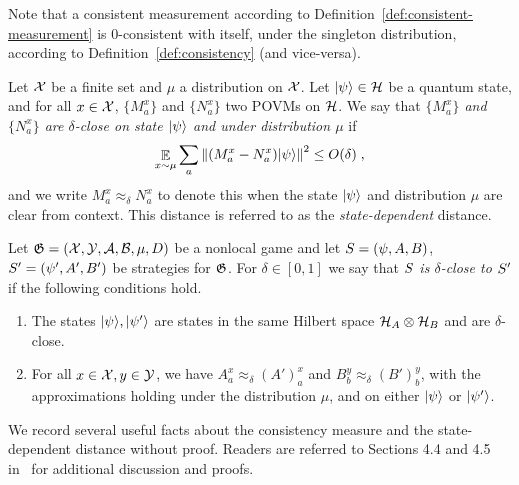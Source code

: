 Note that a consistent measurement according to
Definition~\ref{def:consistent-measurement} is $0$-consistent with itself, under
the singleton distribution, according to Definition~\ref{def:consistency} (and
vice-versa).

\begin{definition}
  \label{def:povm-distance}
	Let $\mX$ be a finite set and $\mu$ a distribution on $\mX$. 
  Let $\ket{\psi} \in \cal{H}$ be a quantum state, and for all $x\in \mX$,
  $\{M^x_a\}$ and $\{N^x_a\}$ two POVMs on $\mH$.
  We say that \emph{$\{M^x_a\}$ and $\{N^x_a\}$ are $\delta$-close on state
    $\ket{\psi}$ and under distribution $\mu$} if
  \begin{equation*}
    \E_{x\sim \mu} \sum_a \norm{ (M^x_a - N^x_a) \ket{\psi} }^2 \leq O(\delta)\;,
  \end{equation*}
  and we write $M^x_a \approx_\delta N^x_a$ to denote this when the state
  $\ket{\psi}$ and distribution $\mu$ are clear from context.
  This distance is referred to as the \emph{state-dependent} distance.
\end{definition}

\begin{definition}
  \label{def:strategy-distance}
  Let $\game = (\cal{X}, \cal{Y}, \cal{A}, \cal{B}, \mu, D)$ be a nonlocal game
  and let $\strategy = (\psi, A, B)$, $\strategy' = (\psi', A', B')$ be 
  strategies for $\game$.
  For $\delta\in[0,1]$ we say that \emph{$\strategy$ is $\delta$-close to
    $\strategy'$} if the following conditions hold.
  \begin{enumerate}
	\item The states $\ket{\psi}, \ket{\psi'}$ are states in the same
    Hilbert space $\mH_A \otimes \mH_B$ and are $\delta$-close.
	\item For all $x \in \cal{X}, y \in \cal{Y}$, we have $A^x_a \approx_\delta
    (A')^x_a$ and $B^y_b \approx_\delta (B')^y_b$, with the approximations
    holding under the distribution $\mu$, and on either $\ket{\psi}$ or
    $\ket{\psi'}$.
  \end{enumerate}
\end{definition}

We record several useful facts about the consistency measure and the
state-dependent distance without proof.
Readers are referred to Sections 4.4 and 4.5 in~\cite{NW19} for additional
discussion and proofs.

